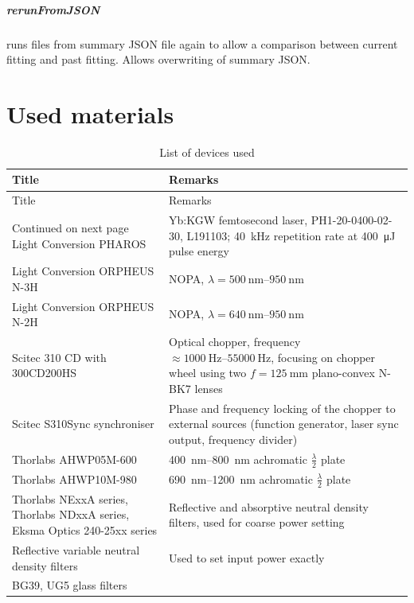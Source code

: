 \documentclass[twoside,openright]{scrreprt}
\begin{document}
{\paragraph{rerunFromJSON} runs files from summary JSON file again to allow a comparison between current fitting and past fitting. Allows overwriting of summary JSON.

\let\cleardoublepage\clearpage
\chapter*{Used materials}
\begin{longtable}{p{}p{}}
    \caption{List of devices used}
    \label{tab:devices} \\
    \toprule 
    Title & Remarks \\
    \midrule
    \endfirsthead
    \toprule 
    Title & Remarks \\
    \midrule
    \endhead
    \midrule
    Continued on next page
    \endfoot
    \bottomrule
    \endlastfoot
    Light Conversion PHAROS & Yb:KGW femtosecond laser, PH1-20-0400-02-30, L191103; \SI{40}{\kilo\hertz} repetition rate at \SI{400}{\micro\joule} pulse energy \\
    Light Conversion ORPHEUS N-3H & NOPA, $ \lambda = \SIrange{500}{950}{\nano\meter} $ \\
    Light Conversion ORPHEUS N-2H & NOPA, $ \lambda = \SIrange{640}{950}{\nano\meter} $ \\
    Scitec 310 CD with 300CD200HS & Optical chopper, frequency $\approx \SIrange{1000}{55000}{\hertz}$, focusing on chopper wheel using two $f=\SI{125}{\milli\meter}$ plano-convex N-BK7 lenses \\
    Scitec S310Sync synchroniser & Phase and frequency locking of the chopper to external sources (function generator, laser sync output, frequency divider) \\
    Thorlabs AHWP05M-600 & \SIrange{400}{800}{\nano\meter} achromatic $\frac{\lambda}{2}$ plate \\
    Thorlabs AHWP10M-980 & \SIrange{690}{1200}{\nano\meter} achromatic $\frac{\lambda}{2}$ plate \\
    Thorlabs NExxA series, Thorlabs NDxxA series, Eksma Optics 240-25xx series & Reflective and absorptive neutral density filters, used for coarse power setting \\
    Reflective variable neutral density filters & Used to set input power exactly \\
    BG39, UG5 glass filters \\

\end{longtable}}
\end{document}
